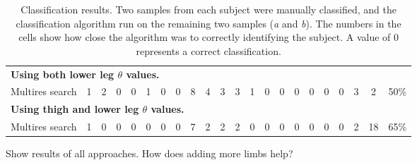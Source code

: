 \begin{landscape}
\begin{table}[ht]
\begin{tabular}{|l|c@{ }c|c@{ }c|c@{ }c|c@{ }c|c@{ }c|c@{ }c|c@{ }c|c@{ }c|c@{ }c|c@{ }c|c|}
			\hline
			\multicolumn{22}{|l|}{\textbf{Using both lower leg $\theta$ values.}} \\
			Multires search            & 1 & 2 & 0 & 0 & 1 & 0 & 0 & 8 & 4 & 3 & 3 & 1 & 0 & 0 & 0 & 0 & 0 & 0 & 3 & 2 & 50\% \\
			
			\hline
			\multicolumn{22}{|l|}{\textbf{Using thigh and lower leg $\theta$ values.}} \\
			Multires search            & 1 & 0 & 0 & 0 & 0 & 0 & 0 & 7 & 2 & 2 & 2 & 0 & 0 & 0 & 0 & 0 & 0 & 0 & 2 & 18 & 65\% \\
			
			\hline
		\end{tabular}
		\caption{Classification results.
			Two samples from each subject were manually classified, and the classification algorithm run on the remaining two samples (\emph{a} and \emph{b}).
			The numbers in the cells show how close the algorithm was to correctly identifying the subject.
			A value of 0 represents a correct classification.}
		\label{ClassificationResults}
	\end{table}
\end{landscape}

Show results of all approaches.
How does adding more limbs help?